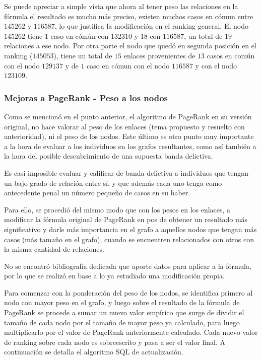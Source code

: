 Se puede apreciar a simple vista que ahora al tener peso las relaciones en la fórmula el resultado es mucho más preciso, existen muchos casos en cómun entre $145262$ y $116587$, lo que justifica la modificación en el ranking general. El nodo $145262$ tiene $1$ caso en cómún con $132310$ y $18$ con $116587$, un total de $19$ relaciones a ese nodo. Por otra parte el nodo que quedó en segunda posición en el ranking ($145053$), tiene un total de $15$ enlaces provenientes de $13$ casos en común con el nodo $129137$ y de $1$ caso en cómun con el nodo $116587$ y con el nodo $123109$.

\subsubsection{Mejoras a PageRank - Peso a los nodos}

Como se mencionó en el punto anterior, el algoritmo de PageRank en su versión original, no hace valorar al peso de los enlaces (tema propuesto y resuelto con anterioridad), ni el peso de los nodos. Este último es otro punto muy importante a la hora de evaluar a los individuos en los grafos resultantes, como así también a la hora del posible descubrimiento de una supuesta banda delictiva.

Es casi imposible evaluar y calificar de banda delictiva a individuos que tengan un bajo grado de relación entre sí, y que además cada uno tenga como antecedente penal un número pequeño de casos en su haber.

Para ello, se procedió del mismo modo que con los pesos en los enlaces, a modificar la fórmula original de PageRank en pos de obtener un resultado más significativo y darle más importancia en el grafo a aquellos nodos que tengan más casos (más tamaño en el grafo), cuando se encuentren relacionados con otros con la misma cantidad de relaciones.

No se encontró bibliografía dedicada que aporte datos para aplicar a la fórmula, por lo que se realizó  en base a lo ya estudiado una modificación propia. 

Para comenzar con la ponderación del peso de los nodos, se identifica primero al nodo con mayor peso en el grafo, y luego sobre el resultado de la fórmula de PageRank se procede a sumar un nuevo valor empírico que surge de dividir el tamaño de cada nodo por el tamaño de mayor peso ya calculado, para luego multiplicarlo por el valor de PageRank anteriormente calculado. Cada nuevo valor de ranking sobre cada nodo es sobreescrito y pasa a ser el valor final. A continuación se detalla el algoritmo SQL de actualización.

